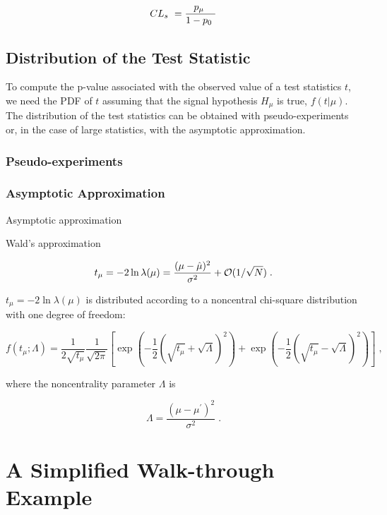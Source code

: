 \begin{equation}
CL_s \  = \dfrac{p_\mu \ }{1 - p_0 \ }
\end{equation}

\subsection{Distribution of the Test Statistic}

To compute the p-value associated with the observed value of a test statistics $t$, we need the PDF of $t$ assuming that the signal hypothesis $H_\mu$ is true, $ f(t | \mu ) $. The distribution of the test statistics can be obtained with pseudo-experiments or, in the case of large statistics, with the asymptotic approximation. 

\subsubsection*{Pseudo-experiments}


\subsubsection*{Asymptotic Approximation}
Asymptotic approximation \cite{Cowan2011}

\noindent Wald's approximation \cite{Wald1943}

\begin{equation}
\label{eq:wald}
t_{\mu} = -2 \ln \lambda(\mu)
= \frac{(\mu - \hat{\mu})^2}{\sigma^2} + {\cal  O}(1/\sqrt{N}) \;.
\end{equation}

 $t_{\mu} = -2 \ln \lambda(\mu)$ is distributed according to a noncentral chi-square distribution with one degree of freedom:

\begin{equation}
\label{eq:stat:ftmulambda}
f(t_{\mu};\Lambda) = \frac{1}{2 \sqrt{t_{\mu}}} \frac{1}{\sqrt{2 \pi}}
\left[ \exp \left( - \frac{1}{2}
\left( \sqrt{t_{\mu}} + \sqrt{\Lambda} \right)^2 \right) +
\exp \left( - \frac{1}{2} \left( \sqrt{t_{\mu}} - \sqrt{\Lambda} \right)^2
\right) \right] \;,
\end{equation}

\noindent where the noncentrality parameter $\Lambda$ is

\begin{equation}
\label{eq:stat:noncentrality}
\Lambda = \frac{(\mu - \mu^{\prime})^2}{\sigma^2} \;.
\end{equation}


\section{A Simplified Walk-through Example}

